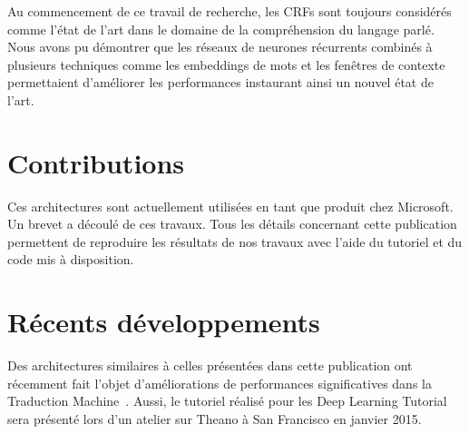Au commencement de ce travail de recherche, les CRFs sont toujours considérés
comme l'état de l'art dans le domaine de la compréhension du langage parlé.
Nous avons pu démontrer que les réseaux de neurones récurrents combinés à
plusieurs techniques comme les embeddings de mots et les fenêtres de contexte
permettaient d'améliorer les performances instaurant ainsi un nouvel état de
l'art.

\section{Contributions}

Ces architectures sont actuellement utilisées en tant que produit chez Microsoft.
Un brevet a découlé de ces travaux. Tous les détails concernant cette
publication permettent de reproduire les résultats de nos travaux avec l'aide
du tutoriel et du code mis à disposition. 

\section{R\'{e}cents d\'{e}veloppements}

Des architectures similaires à celles présentées dans cette publication ont
récemment fait l'objet d'améliorations de performances significatives dans la
Traduction Machine~\citep{Seq-14}. Aussi, le tutoriel réalisé pour les Deep
Learning Tutorial sera présenté lors d'un atelier sur Theano à San Francisco en
janvier 2015.


